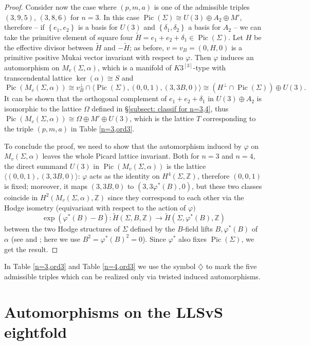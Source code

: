 \documentclass{amsart}
\theoremstyle{definition}
\newcommand{\ra}{\rightarrow}
\newcommand{\IZ}{\mathbb{Z}}
\newcommand{\hskt}{K3^{\left[3\right]}}
\DeclareMathOperator{\pic}{Pic}
\begin{document}
\begin{proof}
Consider now the case where $(p,m,a)$ is one of the admissible triples $(3,9,5)$, $(3,8,6)$ for $n=3$. In this case $\pic(\Sigma) \cong U(3) \oplus A_2 \oplus M'$, therefore -- if $\left\{ e_1, e_2 \right\}$ is a basis for $U(3)$ and $\left\{ \delta_1, \delta_2 \right\}$ a basis for $A_2$ -- we can take the primitive element of square four $\tilde{H} = e_1 + e_2 + \delta_1 \in \pic(\Sigma)$. Let $H$ be the effective divisor between $\tilde{H}$ and $-\tilde{H}$; as before, $v = v_B = (0, H, 0)$ is a primitive positive Mukai vector invariant with respect to $\varphi$. Then $\varphi$ induces an automorphism on $M_v(\Sigma, \alpha)$, which is a manifold of $\hskt$-type with transcendental lattice $\ker(\alpha) \cong S$ and
\[ \pic(M_v(\Sigma, \alpha)) \cong v_B^\perp \cap \langle \pic(\Sigma), (0,0,1), (3,3B, 0) \rangle \cong (H^\perp \cap \pic(\Sigma)) \oplus U(3).\]
It can be shown that the orthogonal complement of $e_1 + e_2 + \delta_1$ in $U(3) \oplus A_2$ is isomorphic to the lattice $\Omega$ defined in \S \ref{subsect: classif for n=3,4}, thus $\pic(M_v(\Sigma, \alpha)) \cong \Omega \oplus M' \oplus U(3)$, which is the lattice $T$ corresponding to the triple $(p,m,a)$ in Table \ref{n=3,ord3}.

To conclude the proof, we need to show that the automorphism induced by $\varphi$ on $M_v(\Sigma, \alpha)$ leaves the whole Picard lattice invariant. Both for $n=3$ and $n=4$, the direct summand $U(3)$ in $\pic\left(M_v(\Sigma, \alpha)\right)$ is the lattice $\langle  (0,0,1), (3,3B, 0) \rangle$: $\varphi$ acts as the identity on $H^4(\Sigma, \IZ)$, therefore $(0,0,1)$ is fixed; moreover, it maps $(3,3B,0)$ to $(3,3 \varphi^*(B),0)$, but these two classes coincide in $H^2(M_v(\Sigma, \alpha), \IZ)$ since they correspond to each other via the Hodge isometry (equivariant with respect to the action of $\varphi)$
$$\exp(\varphi^*(B) - B): \tilde{H}(\Sigma, B, \IZ) \ra \tilde{H}(\Sigma, \varphi^*(B), \IZ)$$
\noindent between the two Hodge structures of $\Sigma$ defined by the $B$-field lifts $B, \varphi^*(B)$ of $\alpha$ (see \cite[\S 2]{stellari_huybrechts} and \cite[Remark 2.4]{ckkm}; here we use $B^2 = \varphi^*(B)^2 = 0$). Since $\varphi^*$ also fixes $\pic(\Sigma)$, we get the result.
\end{proof}

In Table \ref{n=3,ord3} and Table \ref{n=4,ord3} we use the symbol $\diamondsuit$ to mark the five admissible triples which can be realized only via twisted induced automorphisms.


\section{Automorphisms on the LLSvS eightfold} \label{subsection: autom llsvs}
\end{document}
